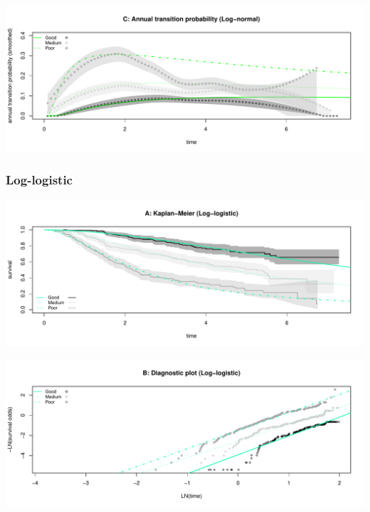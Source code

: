 \documentclass[
]{article}
\begin{document}
\begin{flushleft}\includegraphics[height=0.25\textheight]{BC_OS_output/Images/Figure_param_models-12} \end{flushleft}

\clearpage

\subsubsection{Log-logistic}\label{log-logistic}

\begin{flushleft}\includegraphics[height=0.25\textheight]{BC_OS_output/Images/Figure_param_models-13} \end{flushleft}

\begin{flushleft}\includegraphics[height=0.25\textheight]{BC_OS_output/Images/Figure_param_models-14} \end{flushleft}
\end{document}
